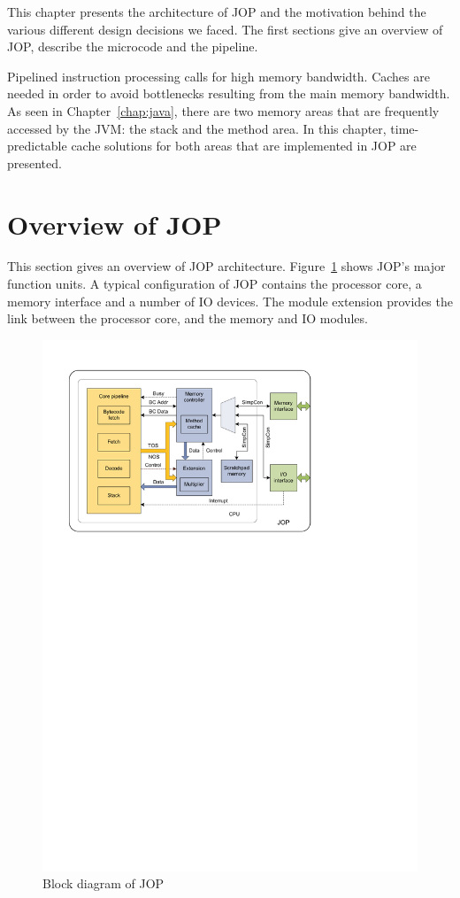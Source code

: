 This chapter presents the architecture of JOP and the motivation
behind the various different design decisions we faced. The first
sections give an overview of JOP, describe the microcode and the
pipeline.

Pipelined instruction processing calls for high memory bandwidth.
Caches are needed in order to avoid bottlenecks resulting from the
main memory bandwidth. As seen in Chapter~\ref{chap:java}, there are
two memory areas that are frequently accessed by the JVM: the stack
and the method area. In this chapter, time-predictable cache
solutions for both areas that are implemented in JOP are presented.

\section{Overview of JOP}

This section gives an overview of JOP architecture.
Figure~\ref{fig:arch:jop:block} shows JOP's major function units. A
typical configuration of JOP contains the processor core, a memory
interface and a number of IO devices. The module extension provides
the link between the processor core, and the memory and IO modules.

\begin{figure}[t]
    \centering
    \includegraphics{arch/arch_jop_block}
    \caption{Block diagram of JOP}
    \label{fig:arch:jop:block}
\end{figure}


